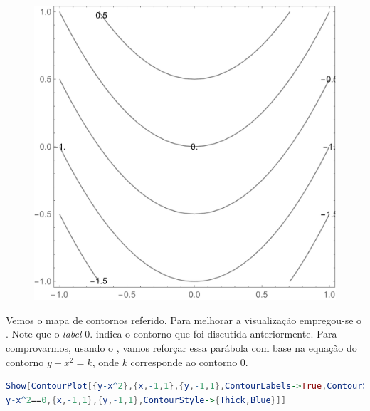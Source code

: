 \documentclass[a4paper, 12pt]{article}
\begin{document}
	\begin{figure}[!h]
		\centering
		\includegraphics[scale=.47]{images/ContourLabels}
	\end{figure}

	Vemos o mapa de contornos referido. Para melhorar a visualização empregou-se o . Note que o \textit{label} 0. indica o contorno que foi discutida anteriormente. Para comprovarmos, usando o , vamos reforçar essa parábola com base na equação do contorno $y-x^{2}=k$, onde $k$ corresponde ao contorno 0.
	
\begin{lstlisting}[language=Mathematica]
Show[ContourPlot[{y-x^2},{x,-1,1},{y,-1,1},ContourLabels->True,ContourShading->False,GridLines->Automatic],ContourPlot[
y-x^2==0,{x,-1,1},{y,-1,1},ContourStyle->{Thick,Blue}]]
\end{lstlisting}
\end{document}
